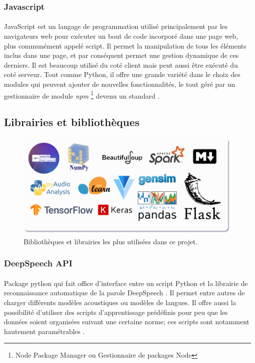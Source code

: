 		\subsubsection*{Javascript} 
		\paragraph{}
		JavaScript est un langage de programmation utilisé principalement par les navigateurs web pour exécuter un bout de code incorporé dans une page web, plus communément appelé script. Il permet la manipulation de tous les éléments inclus dans une page, et par conséquent permet une gestion dynamique de ces derniers. Il est beaucoup utilisé du coté client mais peut aussi être exécuté du coté serveur. Tout comme Python, il offre une grande variété dans le choix des modules qui peuvent ajouter de nouvelles fonctionnalités, le tout géré par un gestionnaire de module \textit{npm} \footnote{Node Package Manager ou Gestionnaire de packages Node} devenu un standard \cite{js}.
	
	\subsection{Librairies et bibliothèques}
	\begin{figure}[H] 
		\centering
		\includegraphics[width=0.9\linewidth]{images/implementation/libs_frams.png}
		\caption{Bibliothèques et librairies les plus utilisées dans ce projet.}
		\label{fig:libs_frams}
	\end{figure}
		\subsubsection*{DeepSpeech API}
		\paragraph{}
		Package python qui fait office d'interface entre un script Python et la librairie de reconnaissance automatique de la parole DeepSpeech \cite{deepspeech_paper}. Il permet entre autres de charger différents modèles acoustiques ou modèles de langues. Il offre aussi la possibilité d'utiliser des scripts d'apprentissage prédéfinis pour peu que les données soient organisées suivant une certaine norme; ces scripts sont notamment hautement paramétrables \cite{deepseech_github}.
		
